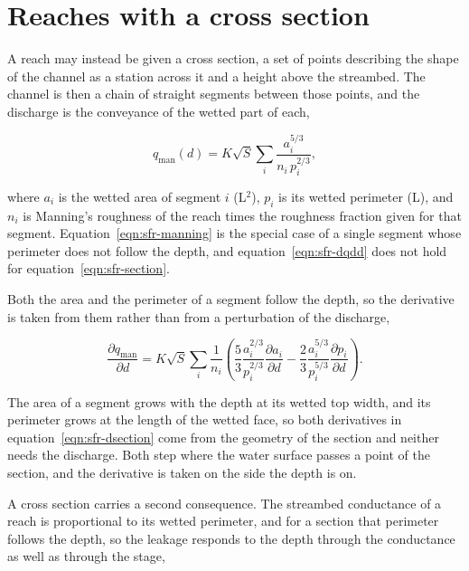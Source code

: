 \section*{Reaches with a cross section}

A reach may instead be given a cross section, a set of points describing the shape of the channel as a station across it and a height above the streambed. The channel is then a chain of straight segments between those points, and the discharge is the conveyance of the wetted part of each,

\begin{equation}
	\label{eqn:sfr-section}
	q_{\mathrm{man}}(d) = K \sqrt{S} \sum_{i} \frac{a_{i}^{5/3}}
	{n_{i} \, p_{i}^{2/3}},
\end{equation}

\noindent where $a_{i}$ is the wetted area of segment $i$ (L$^{2}$), $p_{i}$ is its wetted perimeter (L), and $n_{i}$ is Manning's roughness of the reach times the roughness fraction given for that segment. Equation~\ref{eqn:sfr-manning} is the special case of a single segment whose perimeter does not follow the depth, and equation~\ref{eqn:sfr-dqdd} does not hold for equation~\ref{eqn:sfr-section}.

Both the area and the perimeter of a segment follow the depth, so the derivative is taken from them rather than from a perturbation of the discharge,

\begin{equation}
	\label{eqn:sfr-dsection}
	\frac{\partial q_{\mathrm{man}}}{\partial d} = K \sqrt{S} \sum_{i}
	\frac{1}{n_{i}} \left(
	\frac{5}{3} \frac{a_{i}^{2/3}}{p_{i}^{2/3}}
	\frac{\partial a_{i}}{\partial d} -
	\frac{2}{3} \frac{a_{i}^{5/3}}{p_{i}^{5/3}}
	\frac{\partial p_{i}}{\partial d} \right).
\end{equation}

The area of a segment grows with the depth at its wetted top width, and its perimeter grows at the length of the wetted face, so both derivatives in equation~\ref{eqn:sfr-dsection} come from the geometry of the section and neither needs the discharge. Both step where the water surface passes a point of the section, and the derivative is taken on the side the depth is on.

A cross section carries a second consequence. The streambed conductance of a reach is proportional to its wetted perimeter, and for a section that perimeter follows the depth, so the leakage responds to the depth through the conductance as well as through the stage,

